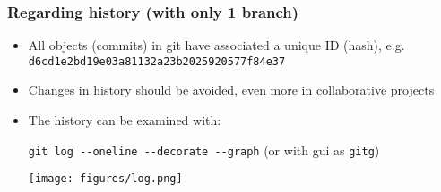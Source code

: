 \documentclass[xcolor=dvipsnames,10pt]{beamer}
\begin{document}
\begin{frame}
 \frametitle{Regarding history (with only 1 branch)}
 
 \begin{itemize}
  \item All objects (commits) in git have associated a unique ID (hash), e.g. \texttt{d6cd1e2bd19e03a81132a23b2025920577f84e37}
  \vspace*{0.2cm}
  
  \item Changes in history should be avoided, even more in collaborative projects
  \vspace*{0.2cm}
  
  \item The history can be examined with:
  
  \texttt{git log -{}-oneline -{}-decorate -{}-graph} (or with gui as \texttt{gitg}) 
  \begin{center}
   \texttt{[image: figures/log.png]}
  \end{center}

  
  
 \end{itemize}

 
\end{frame}
\end{document}
